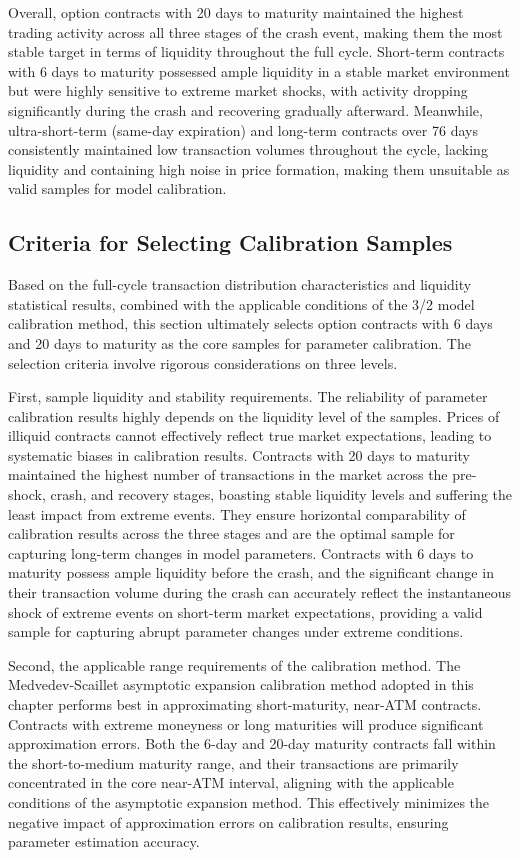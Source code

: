 Overall, option contracts with 20 days to maturity maintained the highest trading activity across all three stages of the crash event, making them the most stable target in terms of liquidity throughout the full cycle. Short-term contracts with 6 days to maturity possessed ample liquidity in a stable market environment but were highly sensitive to extreme market shocks, with activity dropping significantly during the crash and recovering gradually afterward. Meanwhile, ultra-short-term (same-day expiration) and long-term contracts over 76 days consistently maintained low transaction volumes throughout the cycle, lacking liquidity and containing high noise in price formation, making them unsuitable as valid samples for model calibration.

\subsection{Criteria for Selecting Calibration Samples}

Based on the full-cycle transaction distribution characteristics and liquidity statistical results, combined with the applicable conditions of the 3/2 model calibration method, this section ultimately selects option contracts with 6 days and 20 days to maturity as the core samples for parameter calibration. The selection criteria involve rigorous considerations on three levels.

First, sample liquidity and stability requirements. The reliability of parameter calibration results highly depends on the liquidity level of the samples. Prices of illiquid contracts cannot effectively reflect true market expectations, leading to systematic biases in calibration results. Contracts with 20 days to maturity maintained the highest number of transactions in the market across the pre-shock, crash, and recovery stages, boasting stable liquidity levels and suffering the least impact from extreme events. They ensure horizontal comparability of calibration results across the three stages and are the optimal sample for capturing long-term changes in model parameters. Contracts with 6 days to maturity possess ample liquidity before the crash, and the significant change in their transaction volume during the crash can accurately reflect the instantaneous shock of extreme events on short-term market expectations, providing a valid sample for capturing abrupt parameter changes under extreme conditions.

Second, the applicable range requirements of the calibration method. The Medvedev-Scaillet asymptotic expansion calibration method adopted in this chapter performs best in approximating short-maturity, near-ATM contracts. Contracts with extreme moneyness or long maturities will produce significant approximation errors. Both the 6-day and 20-day maturity contracts fall within the short-to-medium maturity range, and their transactions are primarily concentrated in the core near-ATM interval, aligning with the applicable conditions of the asymptotic expansion method. This effectively minimizes the negative impact of approximation errors on calibration results, ensuring parameter estimation accuracy.

